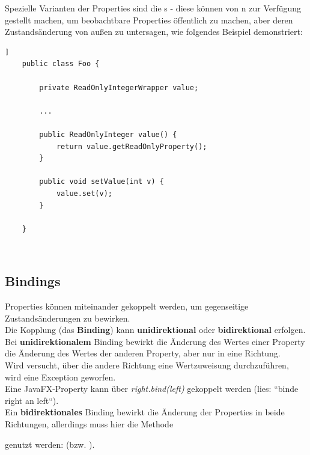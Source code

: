 \noindent
Spezielle Varianten der Properties sind die s - diese können von n zur Verfügung gestellt machen, um beobachtbare Properties öffentlich zu machen, aber deren Zustandsänderung von außen zu untersagen, wie folgendes Beispiel demonstriert:

\begin{verbatim}]
    public class Foo {

        private ReadOnlyIntegerWrapper value;

        ...

        public ReadOnlyInteger value() {
            return value.getReadOnlyProperty();
        }

        public void setValue(int v) {
            value.set(v);
        }

    }
\end{verbatim}\\

\subsection{Bindings}

Properties können miteinander gekoppelt werden, um gegenseitige Zustandsänderungen zu bewirken.\\

\noindent
Die Kopplung (das \textbf{Binding}) kann \textbf{unidirektional} oder \textbf{bidirektional} erfolgen.\\

\noindent
Bei \textbf{unidirektionalem} Binding bewirkt die Änderung des Wertes einer Property die Änderung des Wertes der anderen Property, aber nur in eine Richtung.\\
Wird versucht, über die andere Richtung eine Wertzuweisung durchzuführen, wird eine Exception geworfen.\\
Eine JavaFX-Property kann über \textit{right.bind(left)} gekoppelt werden (lies: ``binde right an left``).\\

\noindent
Ein \textbf{bidirektionales} Binding bewirkt die Änderung der Properties in beide Richtungen, allerdings muss hier die Methode \begin{center}\end{center} genutzt werden:  (bzw. ).



